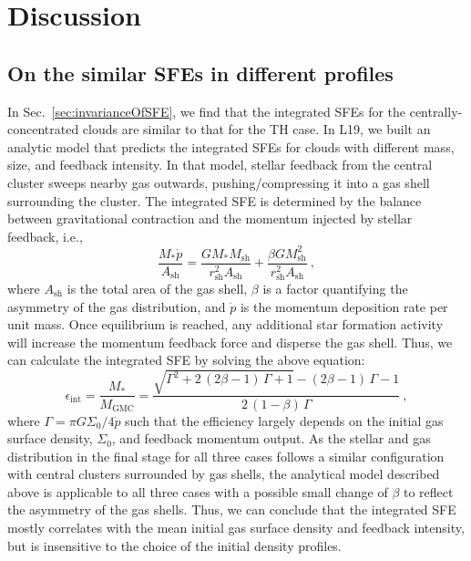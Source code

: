 \documentclass[fleqn,usenatbib]{mnras}
\begin{document}
\section{Discussion}
\label{sec:discussion}

\subsection{On the similar SFEs in different profiles}
\label{sec:theSimilarityOfSFE}

In Sec.~\ref{sec:invarianceOfSFE}, we find that the integrated SFEs for the centrally-concentrated clouds are similar to that for the TH case.
In L19, we built an analytic model that predicts the integrated SFEs for clouds with different mass, size, and feedback intensity.
In that model, stellar feedback from the central cluster sweeps nearby gas outwards, pushing/compressing it into a gas shell surrounding the cluster.
The integrated SFE is determined by the balance between gravitational contraction and the momentum injected by stellar feedback, i.e.,
\begin{equation}
\frac{M_*\dot{p}}{A_\mathrm{sh}}
=\frac{GM_*M_\mathrm{sh}}{r_\mathrm{sh}^2 A_\mathrm{sh}}
+\frac{\beta GM_\mathrm{sh}^2}{r_\mathrm{sh}^2 A_\mathrm{sh}}\:,
\label{eq:balance}
\end{equation}
where $A_\mathrm{sh}$ is the total area of the gas shell, $\beta$ is a factor quantifying the asymmetry of the gas distribution, and $\dot{p}$ is the momentum deposition rate per unit mass.
Once equilibrium is reached, any additional star formation activity will increase the momentum feedback force and disperse the gas shell.
Thus, we can calculate the integrated SFE by solving the above equation:
\begin{equation}
\epsilon_{\mathrm{int}}=\frac{M_*}{M_\mathrm{GMC}}=\frac
{\sqrt{\Gamma^2+2\,(2\beta-1)\,\Gamma+1}-(2\beta-1)\,\Gamma-1}
{2\,(1-\beta)\,\Gamma}\:,
\label{eq:solution}
\end{equation}
where $\Gamma=\pi G\Sigma_0/4\dot{p}$ such that the efficiency largely depends on the initial gas surface density, $\Sigma_0$, and feedback momentum output.
As the stellar and gas distribution in the final stage for all three cases follows a similar configuration with central clusters surrounded by gas shells, the analytical model described above is applicable to all three cases with a possible small change of $\beta$ to reflect the asymmetry of the gas shells.
Thus, we can conclude that the integrated SFE mostly correlates with the mean initial gas surface density and feedback intensity, but is insensitive to the choice of the initial density profiles.
\end{document}
